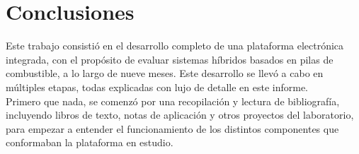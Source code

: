 \section{Conclusiones}\label{concluisiones}
\thispagestyle{plain}

\divider

Este trabajo consistió en el desarrollo completo de una plataforma electrónica integrada, con el propósito de evaluar sistemas híbridos basados en pilas de combustible, a lo largo de nueve meses. Este desarrollo se llevó a cabo en múltiples etapas, todas explicadas con lujo de detalle en este informe.\\

Primero que nada, se comenzó por una recopilación y lectura de bibliografía, incluyendo libros de texto, notas de aplicación y otros proyectos del laboratorio, para empezar a entender el funcionamiento de los distintos componentes que conformaban la plataforma en estudio.\\

